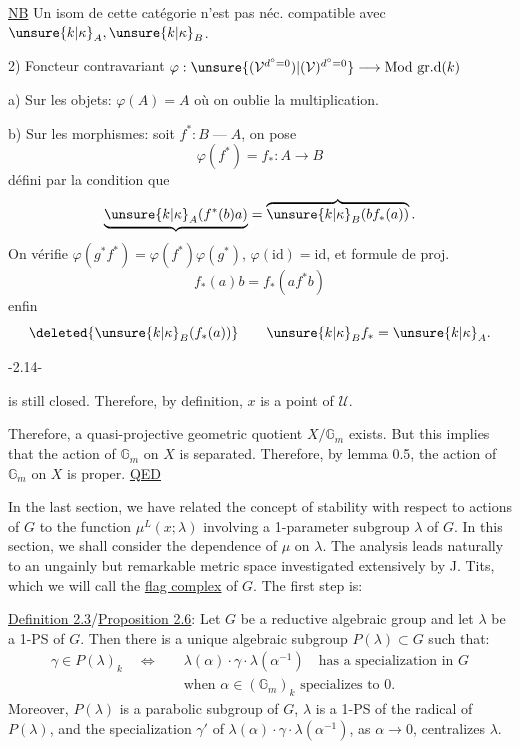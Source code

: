 \uline{NB} Un isom de cette catégorie n'est pas néc. compatible avec  $\unsure{k|\kappa}_A,\unsure{k|\kappa}_B$.

2) Foncteur contravariant $\varphi:\unsure{(\mathcal V^{d^\circ=0})|(\mathcal V)^{d^\circ=0}}\longrightarrow\mathrm{Mod\ gr.d}(k)$

\quad a) Sur les objets: $\varphi(A)=A$ où on oublie la multiplication.

\quad b) Sur les morphismes: soit $f^*:B\mathbin{\text{---}}A$, on pose
\[
\varphi(f^*)=f_*:A\longrightarrow B
\]
défini par la condition que
\[
\underbrace{\unsure{k|\kappa}_A(f^*(b)a)}
=\overbrace{\unsure{k|\kappa}_B(bf_*(a))}.
\]
On vérifie $\varphi(g^*f^*)=\varphi(f^*)\varphi(g^*)$, $\varphi(\mathrm{id})=\mathrm{id}$, et formule de proj.
\[
f_*(a)b=f_*(af^*b)
\]
enfin
\[
\deleted{\unsure{k|\kappa}_B(f_*(a))}\qquad
\unsure{k|\kappa}_Bf_*=\unsure{k|\kappa}_A.
\]
\begin{center}-2.14-\end{center}

is still closed. Therefore, by definition, $x$ is a point of $\mathcal U$.

Therefore, a quasi-projective geometric quotient $X/\mathbb G_m$ exists. But this implies that the action of $\mathbb G_m$ on $X$ is separated. Therefore, by lemma 0.5, the action of $\mathbb G_m$ on $X$ is proper. \uline{QED}

 In the last section, we have related the concept of stability with respect to actions of $G$ to the function $\mu^L(x;\lambda)$ involving a 1-parameter subgroup $\lambda$ of $G$. In this section, we shall consider the dependence of $\mu$ on $\lambda$. The analysis leads naturally to an ungainly but remarkable metric space investigated extensively by J. Tits, which we will call the \uline{flag complex} of $G$. The first step is:

\uline{Definition 2.3}/\uline{Proposition 2.6}: Let $G$ be a reductive algebraic group and let $\lambda$ be a 1-PS of $G$. Then there is a unique algebraic subgroup $P(\lambda)\subset G$ such that:
\[
\begin{aligned}
\gamma\in P(\lambda)_k\quad\Longleftrightarrow\quad&
\lambda(\alpha)\cdot\gamma\cdot\lambda(\alpha^{-1})\quad\text{has a specialization in }G\\
&\text{when }\alpha\in(\mathbb G_m)_k\text{ specializes to }0.
\end{aligned}
\]
Moreover, $P(\lambda)$ is a parabolic subgroup of $G$, $\lambda$ is a 1-PS of the radical of $P(\lambda)$, and the specialization $\gamma'$ of $\lambda(\alpha)\cdot\gamma\cdot\lambda(\alpha^{-1})$, as $\alpha\longrightarrow0$, centralizes $\lambda$.


